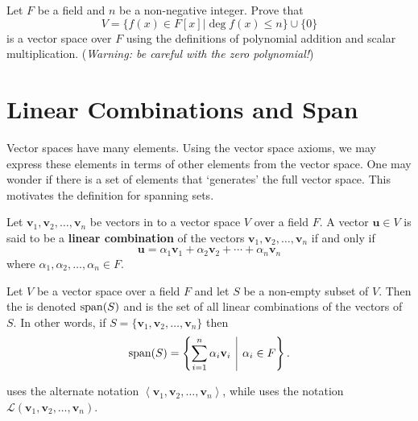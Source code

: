 \begin{exercise}
    Let $F$ be a field and $n$ be a non-negative integer. Prove that
    \[
        V = \{f(x) \in F[x] \vert \deg f(x) \leq n\} \cup \{0\}
    \]
    is a vector space over $F$ using the definitions of polynomial addition and scalar multiplication.\newline
    (\textit{Warning: be careful with the zero polynomial!})
\end{exercise}

\section{Linear Combinations and Span}
Vector spaces have many elements. Using the vector space axioms, we may express these elements in terms of other elements from the vector space. One may wonder if there is a set of elements that `generates' the full vector space. This motivates the definition for spanning sets.

\begin{definition}
    Let $\mathbf{v}_1, \mathbf{v}_2, \dots, \mathbf{v}_n$ be vectors in to a vector space $V$ over a field $F$. A vector $\mathbf{u} \in V$ is said to be a \textbf{linear combination} of the vectors $\mathbf{v}_1, \mathbf{v}_2, \dots, \mathbf{v}_n$ if and only if
    \[
        \mathbf{u} = \alpha_1\mathbf{v}_1 + \alpha_2\mathbf{v}_2 + \cdots + \alpha_n \mathbf{v}_n
    \]
    where $\alpha_1, \alpha_2, \dots, \alpha_n \in F$.
\end{definition}

\begin{definition}
    Let $V$ be a vector space over a field $F$ and let $S$ be a non-empty subset of $V$. Then the  is denoted $\mathrm{span}(S)$ and is the set of all linear combinations of the vectors of $S$. In other words, if $S = \{\mathbf{v}_1, \mathbf{v}_2, \dots, \mathbf{v}_n\}$ then
    \[
        \Span{S} = \left\{\sum_{i=1}^n \alpha_i\mathbf{v}_i \vert \alpha_i \in F\right\}.
    \]
\end{definition}
\begin{remark}
    \cite[p.~331]{gallian_2016} uses the alternate notation $\left\langle\mathbf{v}_1, \mathbf{v}_2, \dots, \mathbf{v}_n\right\rangle$, while \cite[p.~31]{treil_2017} uses the notation $\mathcal{L}\left(\mathbf{v}_1, \mathbf{v}_2, \dots, \mathbf{v}_n\right)$.
\end{remark}

